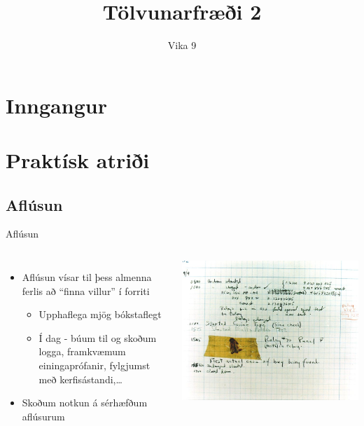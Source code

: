 \documentclass[handout]{beamer}
\title{Tölvunarfræði 2}
\subtitle{Vika 9}
\begin{document}
\begin{frame}
	\titlepage
\end{frame}

\section{Inngangur}

\section{Praktísk atriði}

\subsection{Aflúsun}

\begin{frame}{Aflúsun}
	\begin{columns}
		\begin{itemize}
			\item Aflúsun  vísar til þess almenna ferlis að ``finna villur'' í forriti
			      \begin{itemize}
				      \item Upphaflega mjög bókstaflegt
				      \item Í dag - búum til og skoðum logga, framkvæmum einingaprófanir, fylgjumst með kerfisástandi,\ldots
			      \end{itemize}
			\item Skoðum notkun á sérhæfðum aflúsurum 
		\end{itemize}
		\begin{center}
			\includegraphics[width=\textwidth]{../T1a/Pics/first-bug}
		\end{center}
	\end{columns}
\end{frame}
\end{document}

